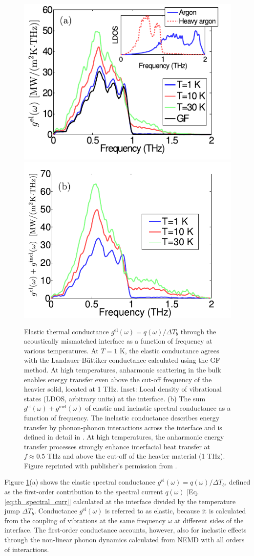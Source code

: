 \begin{figure}[tb]
 \begin{center}
  \includegraphics[width=.49\columnwidth]{pics/nemd_fig4a.pdf}
  \includegraphics[width=.49\columnwidth]{pics/nemd_fig4b.pdf}
  \caption{Elastic thermal conductance $g^{\textrm{el}}(\omega)=q(\omega)/\Delta T_b$ through the acoustically mismatched interface as a function of frequency at various temperatures.  At $T=1$ K, the elastic conductance agrees with the Landauer-B\"uttiker conductance calculated using the GF method. At high temperatures, anharmonic scattering in the bulk enables energy transfer even above the cut-off frequency of the heavier solid, located at 1 THz.  Inset: Local density of vibrational states (LDOS, arbitrary units) at the interface. (b) The sum $g^{\textrm{el}}(\omega)+ g^{\textrm{inel}}(\omega)$ of elastic and inelastic spectral conductance as a function of frequency. The inelastic conductance describes energy transfer by phonon-phonon interactions across the interface and is defined in detail in . At high temperatures, the anharmonic energy transfer processes strongly enhance interfacial heat transfer at $f\approx 0.5$ THz and above the cut-off of the heavier material (1 THz). Figure reprinted with publisher's permission from .} 
 \label{fig:nemd_fig2}
 \end{center}
\end{figure}

Figure \ref{fig:nemd_fig2}(a) shows the elastic spectral conductance $g^{\textrm{el}}(\omega)=q(\omega)/\Delta T_b$, defined as the first-order contribution to the spectral current $q(\omega)$ [Eq. \eqref{eq:th_spectral_curr}] calculated at the interface divided by the temperature jump $\Delta T_b$. Conductance $g^{\textrm{el}}(\omega)$ is referred to as elastic, because it is calculated from the coupling of vibrations at the same frequency $\omega$ at different sides of the interface. The first-order conductance accounts, however, also for inelastic effects through the non-linear phonon dynamics calculated from NEMD with all orders of interactions. 

